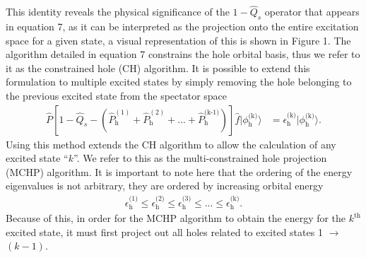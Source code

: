 \documentclass[11.5pt]{article}
\begin{document}
This identity reveals the physical significance of the $1 - \hat{Q}_s$ operator that appears in equation 7, as it can be interpreted as the projection onto the entire excitation space for a given state, a visual representation of this is shown in Figure 1. The algorithm detailed in equation 7 constrains the hole orbital basis, thus we refer to it as the constrained hole (CH) algorithm. It is possible to extend this formulation to multiple excited states by simply removing the hole belonging to the previous excited state from the spectator space
\begin{align}
\hat{P}[1 - \hat{Q}_s - (\hat{P}^{(1)}_{\text{h}} + \hat{P}^{(2)}_{\text{h}} + ... +\hat{P}^{\text{(k-1)}}_{\text{h}})]\hat{f} |\phi_{\text{h}}^{\text{(k)}}\rangle &= \epsilon^{\text{(k)}}_{\text{h}} |\phi_{\text{h}}^{\text{(k)}}\rangle .
\end{align}
Using this method extends the CH algorithm to allow the calculation of any excited state ``$k$''. We refer to this as the multi-constrained hole projection (MCHP) algorithm. It is important to note here that the ordering of the energy eigenvalues is not arbitrary, they are ordered by increasing orbital energy
\begin{align}
\epsilon^{\text{(1)}}_{\text{h}} \le \epsilon^{\text{(2)}}_{\text{h}} \le \epsilon^{\text{(3)}}_{\text{h}} \le ... \le \epsilon^{\text{(k)}}_{\text{h}} .
\end{align}
Because of this, in order for the MCHP algorithm to obtain the energy for the $k^{\text{th}}$ excited state, it must first project out all holes related to excited states 1 $\rightarrow$ $(k-1)$.
\end{document}
